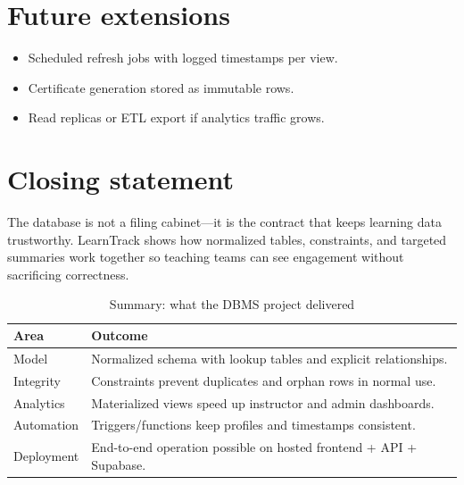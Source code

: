 \section{Future extensions}
\begin{itemize}[leftmargin=*]
  \item Scheduled refresh jobs with logged timestamps per view.

  \item Certificate generation stored as immutable rows.

  \item Read replicas or ETL export if analytics traffic grows.

\end{itemize}

\section{Closing statement}
The database is not a filing cabinet---it is the contract that keeps learning data trustworthy. LearnTrack shows how normalized tables, constraints, and targeted summaries work together so teaching teams can see engagement without sacrificing correctness.

\begin{table}[htbp]
\centering
\caption{Summary: what the DBMS project delivered}
\begin{tabular}{@{}p{3.7cm}p{8.9cm}@{}}
\toprule
\textbf{Area} & \textbf{Outcome} \\
\midrule
Model & Normalized schema with lookup tables and explicit relationships. \\
Integrity & Constraints prevent duplicates and orphan rows in normal use. \\
Analytics & Materialized views speed up instructor and admin dashboards. \\
Automation & Triggers/functions keep profiles and timestamps consistent. \\
Deployment & End-to-end operation possible on hosted frontend + API + Supabase. \\
\bottomrule
\end{tabular}
\end{table}

